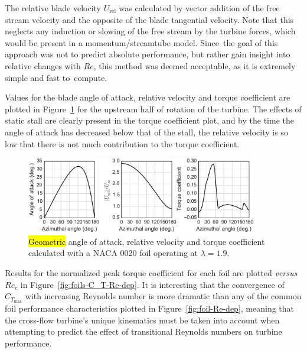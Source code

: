 \documentclass[energies,article,accept,moreauthors,pdftex,10pt,a4paper]{mdpi}
\theoremstyle{mdpi}
\newcounter{ex}
\newcounter{re}
\begin{document}
The relative blade velocity $U_\mathrm{rel}$ was calculated by vector addition
of the free stream velocity and the opposite of the blade tangential velocity.
Note that this neglects any induction or slowing of the free stream by the
turbine forces, which would be present in a momentum/streamtube model. Since~the
goal of this approach was not to predict absolute performance, but rather gain
insight into relative changes with $Re$, this method was deemed acceptable, as it
is extremely simple and fast to~compute.

Values for the blade angle of attack, relative velocity and torque coefficient
are plotted in Figure~\ref{fig:blade-kinematics} for the upstream half of
rotation of the turbine. The effects of static stall are clearly present in the
torque coefficient plot, and by the time the angle of attack has decreased below
that of the stall, the relative velocity is so low that there is not much
contribution to the torque coefficient.

\begin{figure}[ht!]
\centering

\includegraphics[width=0.9\textwidth]{figures/foil_kinematics_ct}

\caption{\hl {Geometric} angle of attack, relative velocity and torque coefficient
 calculated with a NACA 0020 foil operating at $\lambda=1.9$.}
\label{fig:blade-kinematics}
\end{figure}

Results for the normalized peak torque coefficient for each foil are plotted
\textit{versus} $Re_c$ in Figure~\ref{fig:foils-C_T-Re-dep}. It is interesting that the
convergence of $C_{T_\mathrm{max}}$ with increasing Reynolds number is more
dramatic than any of the common foil performance characteristics plotted in
Figure~\ref{fig:foil-Re-dep}, meaning that the cross-flow turbine's unique
kinematics must be taken into account when attempting to predict the effect of
transitional Reynolds numbers on turbine performance.
\end{document}
